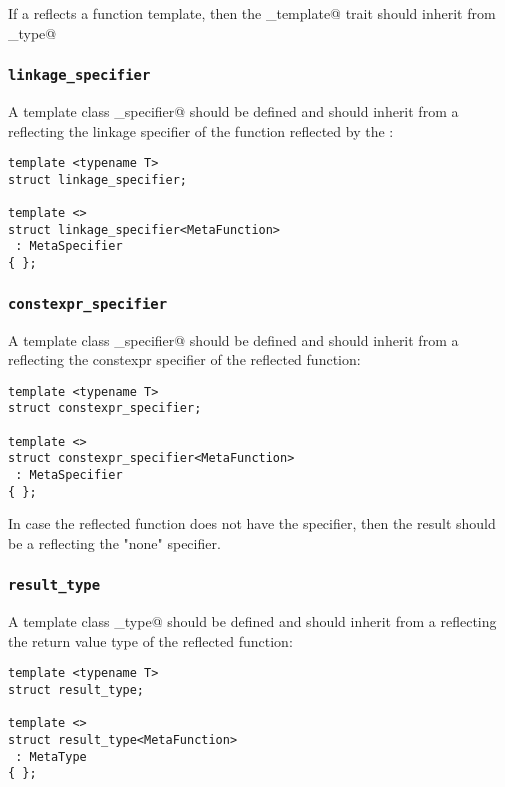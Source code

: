 If a  reflects a function template, then the \verb@is_template@
trait should inherit from \verb@true_type@

\subsubsection{\texttt{linkage\_specifier}}

A template class \verb@linkage_specifier@ should be defined and should inherit from
a  reflecting the linkage specifier of the function reflected by
the :

\begin{verbatim}
template <typename T>
struct linkage_specifier;

template <>
struct linkage_specifier<MetaFunction>
 : MetaSpecifier
{ };
\end{verbatim}

\subsubsection{\texttt{constexpr\_specifier}}

A template class \verb@constexpr_specifier@ should be defined and should inherit from
a  reflecting the constexpr specifier of the reflected function:

\begin{verbatim}
template <typename T>
struct constexpr_specifier;

template <>
struct constexpr_specifier<MetaFunction>
 : MetaSpecifier
{ };
\end{verbatim}

In case the reflected function does not have the \verb@constexpr@ specifier,
then the result should be a  reflecting the "none" specifier.

\subsubsection{\texttt{result\_type}}

A template class \verb@result_type@ should be defined and should inherit from
a  reflecting the return value type of the reflected function:

\begin{verbatim}
template <typename T>
struct result_type;

template <>
struct result_type<MetaFunction>
 : MetaType
{ };
\end{verbatim}

